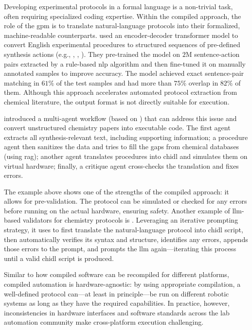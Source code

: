 Developing experimental protocols in a formal language is a non-trivial task, often requiring specialized coding expertise. 
Within the compiled approach, the role of the \gls{gpm} is to translate natural-language protocols into their formalized, machine-readable counterparts.\autocite{Lamas2024DSLXpert, jiang2024protocode, conrad2025lowering, inagaki2023robotic} \textcite{Vaucher2020AutoExtraction} used an encoder-decoder transformer model to convert English experimental procedures to structured sequences of pre-defined synthesis actions (e.g., , , ). They pre-trained the model on $2$M sentence-action pairs extracted by a rule-based \gls{nlp} algorithm and then fine-tuned it on manually annotated samples to improve accuracy. 
The model achieved exact sentence-pair matching in $61\%$ of the test samples and had more than $75\%$ overlap in $82\%$ of them. 
Although this approach accelerates automated protocol extraction from chemical literature, the output format is not directly suitable for execution. 

\textcite{Pagel2024LLMChemputer} introduced a multi-agent workflow (based on ) that can address this issue and convert unstructured chemistry papers into executable code. 
The first agent extracts all synthesis-relevant text, including supporting information; a procedure agent then sanitizes the data and tries to fill the gaps from chemical databases (using \gls{rag}); another agent translates procedures into \gls{chidl} and simulates them on virtual hardware; finally, a critique agent cross-checks the translation and fixes errors.

The example above shows one of the strengths of the compiled approach: it allows for pre-validation. 
The protocol can be simulated or checked for any errors before running on the actual hardware, ensuring safety. 
Another example of \gls{llm}-based validators for chemistry protocols is .\autocite{Yoshikawa2023CLAIRify} 
Leveraging an iterative prompting strategy, it uses  to first translate the natural-language protocol into \gls{chidl} script, then automatically verifies its syntax and structure, identifies any errors, appends those errors to the prompt, and prompts the \gls{llm} again---iterating this process until a valid \gls{chidl} script is produced. 

Similar to how compiled software can be recompiled for different platforms, compiled automation is hardware-agnostic: by using appropriate compilation, a well-defined protocol can---at least in principle---be run on different robotic systems as long as they have the required capabilities.\autocite{rauschen2024universal, strieth-kalthoff2024delocalized,wilbraham2021chemPU} 
In practice, however, inconsistencies in hardware interfaces and software standards across the lab automation community make cross-platform execution challenging.


